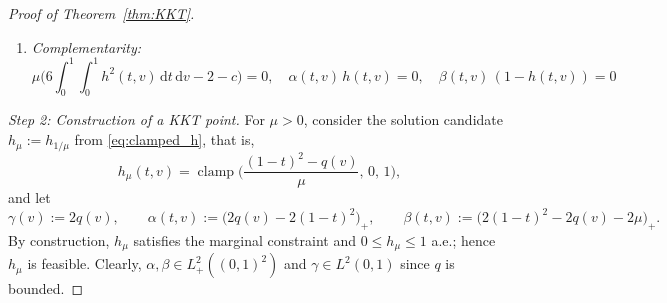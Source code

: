 \documentclass{article}
\DeclareMathOperator{\clamp}{clamp}
\newcommand{\1}{\mathds{1}}
\newcommand{\de}{\mathrm{\,d}}
\begin{document}
\begin{proof}[Proof of Theorem~\ref{thm:KKT}]
\begin{enumerate}[label=(\roman*)]
  \item \emph{Complementarity:}
  \begin{equation}\label{eq:compl-ref}
     \mu\Big(6\int_0^1\int_0^1 h^2(t,v)\de t\de v-2-c\Big)=0,\quad
     \alpha(t,v)\,h(t,v)=0,\quad
     \beta(t,v)\,(1-h(t,v))=0
  \end{equation}
\end{enumerate}

\smallskip
\emph{Step 2: Construction of a KKT point.}
For $\mu>0$, consider the solution candidate $h_\mu:=h_{1/\mu}$ from \eqref{eq:clamped_h}, that is,
\begin{equation}\label{eq:def-candidate}
  h_\mu(t,v)=\clamp\!\Big(\frac{(1-t)^2-q(v)}{\mu},\,0,\,1\Big),
\end{equation}
and let
\begin{equation}\label{eq:def-alphabeta}
    \gamma(v):=2q(v),\qquad
  \alpha(t,v):=\big(2q(v)-2(1-t)^2\big)_+,\qquad
  \beta(t,v):=\big(2(1-t)^2-2q(v)-2\mu\big)_+.
\end{equation}
By construction, $h_\mu$ satisfies the marginal constraint and $0\le h_\mu\le 1$ a.e.; hence $h_\mu$ is feasible.
Clearly, $\alpha,\beta\in L^2_+((0,1)^2)$ and $\gamma\in L^2(0,1)$ since $q$ is bounded.


\end{proof}
\end{document}

